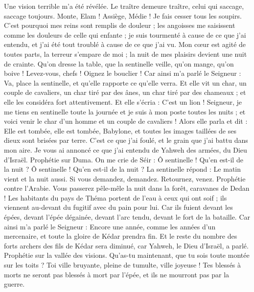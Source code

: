 \begin{multicols}{2}
Une vision terrible m'a été révélée. Le traître demeure traître, celui qui saccage, saccage toujours. Monte, Elam ! Assiège, Médie ! Je fais cesser tous les soupirs.
C'est pourquoi mes reins sont remplis de douleur ; les angoisses me saisissent comme les douleurs de celle qui enfante ; je suis tourmenté à cause de ce que j'ai entendu, et j'ai été tout troublé à cause de ce que j'ai vu.
Mon cœur est agité de toutes parts, la terreur s'empare de moi ; la nuit de mes plaisirs devient une nuit de crainte.
Qu'on dresse la table, que la sentinelle veille, qu'on mange, qu'on boive ! Levez-vous, chefs ! Oignez le bouclier !
Car ainsi m'a parlé le Seigneur : Va, place la sentinelle, et qu'elle rapporte ce qu'elle verra.
Et elle vit un char, un couple de cavaliers, un char tiré par des ânes, un char tiré par des chameaux ; et elle les considéra fort attentivement.
Et elle s'écria : C'est un lion ! Seigneur, je me tiens en sentinelle toute la journée et je suis à mon poste toutes les nuits ;
et voici venir le char d'un homme et un couple de cavaliers ! Alors elle parla et dit : Elle est tombée, elle est tombée, Babylone, et toutes les images taillées de ses dieux sont brisées par terre.
C'est ce que j'ai foulé, et le grain que j'ai battu dans mon aire. Je vous ai annoncé ce que j'ai entendu de Yahweh des armées, du Dieu d'Israël.
Prophétie sur Duma. On me crie de Séir : Ô sentinelle ! Qu'en est-il de la nuit ? Ô sentinelle ! Qu'en est-il de la nuit ?
La sentinelle répond : Le matin vient et la nuit aussi. Si vous demandez, demandez. Retournez, venez.
Prophétie contre l'Arabie. Vous passerez pêle-mêle la nuit dans la forêt, caravanes de Dedan !
Les habitants du pays de Théma portent de l'eau à ceux qui ont soif ; ils viennent au-devant du fugitif avec du pain pour lui.
Car ils fuient devant les épées, devant l'épée dégainée, devant l'arc tendu, devant le fort de la bataille.
Car ainsi m'a parlé le Seigneur : Encore une année, comme les années d'un mercenaire, et toute la gloire de Kédar prendra fin.
Et le reste du nombre des forts archers des fils de Kédar sera diminué, car Yahweh, le Dieu d'Israël, a parlé.
\VerseOne{}Prophétie sur la vallée des visions. Qu'as-tu maintenant, que tu sois toute montée sur les toits ?
Toi ville bruyante, pleine de tumulte, ville joyeuse ! Tes blessés à morts ne seront pas blessés à mort par l'épée, et ils ne mourront pas par la guerre.

\end{multicols}
